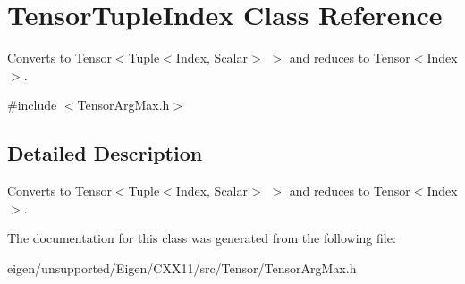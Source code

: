 \hypertarget{class_tensor_tuple_index}{}\section{Tensor\+Tuple\+Index Class Reference}
\label{class_tensor_tuple_index}


Converts to Tensor$<$Tuple$<$\+Index, Scalar$>$ $>$ and reduces to Tensor$<$\+Index$>$.  




{\ttfamily \#include $<$Tensor\+Arg\+Max.\+h$>$}



\subsection{Detailed Description}
Converts to Tensor$<$Tuple$<$\+Index, Scalar$>$ $>$ and reduces to Tensor$<$\+Index$>$. 

The documentation for this class was generated from the following file\+:\begin{DoxyCompactItemize}
\item 
eigen/unsupported/\+Eigen/\+C\+X\+X11/src/\+Tensor/\+Tensor\+Arg\+Max.\+h\end{DoxyCompactItemize}
